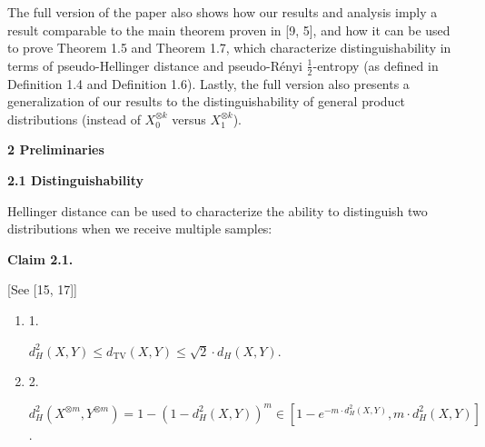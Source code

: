 The full version of the paper also shows how our results and analysis imply a result comparable to the main theorem proven in [9, 5], and how it can be used to prove Theorem 1.5 and Theorem 1.7, which characterize distinguishability in terms of pseudo-Hellinger distance and pseudo-Rényi $\frac{1}{2}$-entropy (as defined in Definition 1.4 and Definition 1.6). Lastly, the full version also presents a generalization of our results to the distinguishability of general product distributions (instead of $X_{0}^{\otimes k}$ versus $X_{1}^{\otimes k}$).\par






\par\medskip\noindent\textbf{
2 Preliminaries}\par




\par\medskip\noindent\textbf{
2.1 Distinguishability}\par




Hellinger distance can be used to characterize the ability to distinguish two distributions when we receive multiple samples:\par





\par\medskip\noindent\textbf{
Claim 2.1. 
}\par



[See [15, 17]]\par


\begin{enumerate}


\item[] 
1. 


$d_{H}^{2}(X,Y)\leq d_{\mathrm{TV}}(X,Y)\leq\sqrt{2}\cdot d_{H}(X,Y)$.\par





\item[] 
2. 


$d_{H}^{2}(X^{\otimes m},Y^{\otimes m})=1-(1-d_{H}^{2}(X,Y))^{m}\in[1-e^{-m\cdot d_{H}^{2}(X,Y)},m\cdot d_{H}^{2}(X,Y)]$.\par





\end{enumerate}



